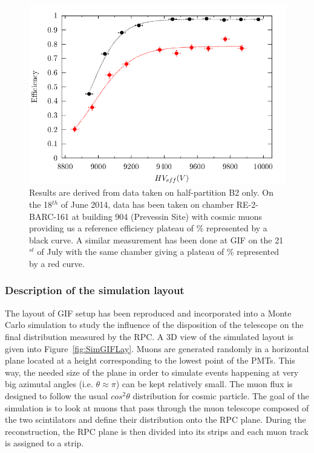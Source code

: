 		\begin{figure}[!h]
			\begin{center}
				\includegraphics[width = \plotwidth]{fig/Comparison.pdf}
			\end{center}
			\caption{\label{fig:EffCompar} Results are derived from data taken on half-partition B2 only. On the 18$^{th}$ of June 2014, data has been taken on chamber RE-2-BARC-161 at building 904 (Prevessin Site) with cosmic muons providing us a reference efficiency plateau of \% represented by a black curve. A similar measurement has been done at GIF on the 21$^{st}$ of July with the same chamber giving a plateau of \% represented by a red curve.}
		\end{figure}
		
		\subsubsection{Description of the simulation layout}
		\label{sssec:SimLayout}
		
			The layout of GIF setup has been reproduced and incorporated into a Monte Carlo simulation to study the influence of the disposition of the telescope on the final distribution measured by the RPC. A 3D view of the simulated layout is given into Figure~\ref{fig:SimGIFLay}. Muons are generated randomly in a horizontal plane located at a height corresponding to the lowest point of the PMTs. This way, the needed size of the plane in order to simulate events happening at very big azimutal angles (i.e. $\theta\approx\pi$) can be kept relatively small. The muon flux is designed to follow the usual $cos^2\theta$ distribution for cosmic particle. The goal of the simulation is to look at muons that pass through the muon telescope composed of the two scintilators and define their distribution onto the RPC plane. During the reconstruction, the RPC plane is then divided into its strips and each muon track is assigned to a strip.
		
